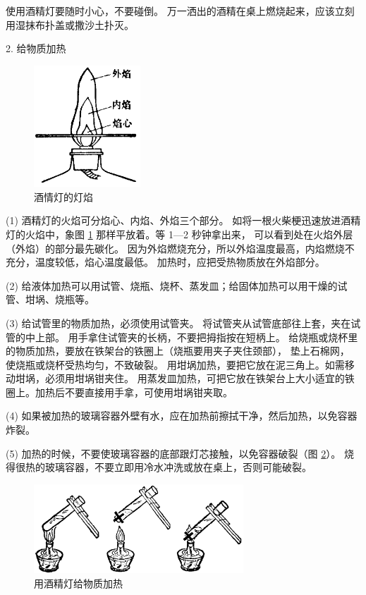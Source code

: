 使用酒精灯要随时小心，不要碰倒。
万一洒出的酒精在桌上燃烧起来，应该立刻用湿抹布扑盖或撒沙土扑灭。

2. 给物质加热

\begin{figure}
    \centering
    \includegraphics[width=4cm]{../pic/czhx1-xssy-07}
    \caption{酒情灯的灯焰}\label{fig:xssy-7}
\end{figure}

(1) 酒精灯的火焰可分焰心、内焰、外焰三个部分。
如将一根火柴梗迅速放进酒精灯的火焰中，象图 \ref{fig:xssy-7} 那样平放着。等 1—2 秒钟拿出来，
可以看到处在火焰外层（外焰）的部分最先碳化。
因为外焰燃烧充分，所以外焰温度最高，内焰燃烧不充分，温度较低，焰心温度最低。
加热时，应把受热物质放在外焰部分。


(2) 给液体加热可以用试管、烧瓶、烧杯、蒸发皿；给固体加热可以用干燥的试管、坩埚、烧瓶等。

(3) 给试管里的物质加热，必须使用试管夹。
将试管夹从试管底部往上套，夹在试管的中上部。
用手拿住试管夹的长柄，不要把拇指按在短柄上。
给烧瓶或烧杯里的物质加热，要放在铁架台的铁圈上（烧瓶要用夹子夹住颈部）， 垫上石棉网，
使烧瓶或烧杯受热均匀，不致破裂。
用坩埚加热，要把它放在泥三角上。如需移动坩埚，必须用坩埚钳夹住。
用蒸发皿加热，可把它放在铁架台上大小适宜的铁圈上。加热后不要直接用手拿，可使用坩埚钳夹取。

(4) 如果被加热的玻璃容器外壁有水，应在加热前擦拭干净，然后加热，以免容器炸裂。

(5) 加热的时候，不要使玻璃容器的底部跟灯芯接触，以免容器破裂（图 \ref{fig:xssy-8}）。
烧得很热的玻璃容器，不要立即用冷水冲洗或放在桌上，否则可能破裂。

\begin{figure}[htbp]
    \centering
    \includegraphics[width=0.7\textwidth]{../pic/czhx1-xssy-08}
    \caption{用酒精灯给物质加热}\label{fig:xssy-8}
\end{figure}


